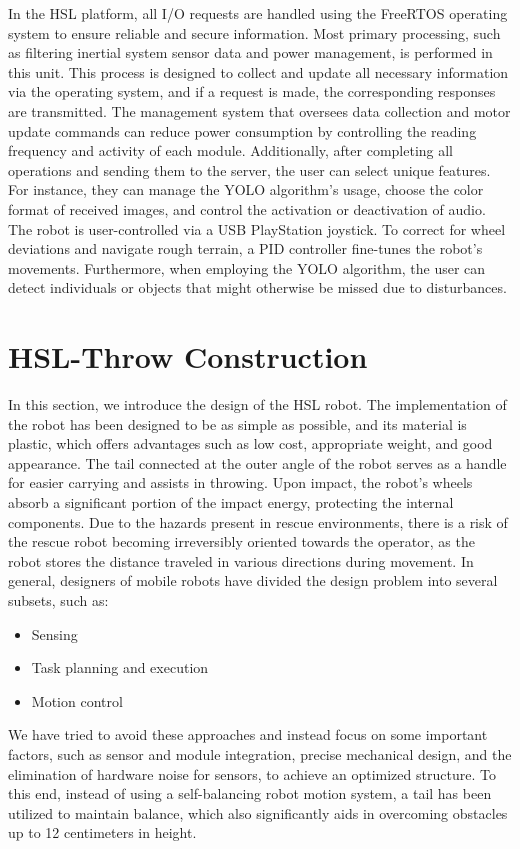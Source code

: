 \documentclass[conference]{IEEEtran}
\begin{document}
In the HSL platform, all I/O requests are handled using the FreeRTOS operating system to ensure reliable and secure information. Most primary processing, such as filtering inertial system sensor data and power management, is performed in this unit. This process is designed to collect and update all necessary information via the operating system, and if a request is made, the corresponding responses are transmitted. The management system that oversees data collection and motor update commands can reduce power consumption by controlling the reading frequency and activity of each module. Additionally, after completing all operations and sending them to the server, the user can select unique features. For instance, they can manage the YOLO algorithm's usage, choose the color format of received images, and control the activation or deactivation of audio. The robot is user-controlled via a USB PlayStation joystick. To correct for wheel deviations and navigate rough terrain, a PID controller fine-tunes the robot's movements. Furthermore, when employing the YOLO algorithm, the user can detect individuals or objects that might otherwise be missed due to disturbances.

\section{HSL-Throw Construction}
In this section, we introduce the design of the HSL robot. The implementation of the robot has been designed to be as simple as possible, and its material is plastic, which offers advantages such as low cost, appropriate weight, and good appearance. The tail connected at the outer angle of the robot serves as a handle for easier carrying and assists in throwing. Upon impact, the robot's wheels absorb a significant portion of the impact energy, protecting the internal components. Due to the hazards present in rescue environments, there is a risk of the rescue robot becoming irreversibly oriented towards the operator, as the robot stores the distance traveled in various directions during movement. In general, designers of mobile robots have divided the design problem into several subsets, such as:
\begin{itemize}
    \item Sensing
    \item Task planning and execution
    \item Motion control
\end{itemize}

We have tried to avoid these approaches and instead focus on some important factors, such as sensor and module integration, precise mechanical design, and the elimination of hardware noise for sensors, to achieve an optimized structure. To this end, instead of using a self-balancing robot motion system, a tail has been utilized to maintain balance, which also significantly aids in overcoming obstacles up to 12 centimeters in height.
\end{document}
